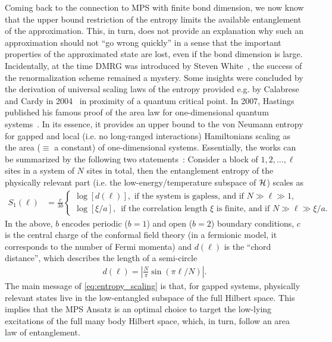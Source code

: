 Coming back to the connection to MPS with finite bond dimension, we now know that the upper bound restriction of the entropy limits the available entanglement of the approximation.
This, in turn, does not provide an explanation why such an approximation should not ``go wrong quickly'' in a sense that the important properties of the approximated state are lost, even if the bond dimension is large.
Incidentally, at the time DMRG was introduced by Steven White~\cite{White1992}, the success of the renormalization scheme remained a mystery.
Some insights were concluded by the derivation of universal scaling laws of the entropy provided e.g. by Calabrese and Cardy in 2004~\cite{Calabrese2004} in proximity of a quantum critical point.
In 2007, Hastings published his famous proof of the area law for one-dimensional quantum systems~\cite{Hastings2007}.
In its essence, it provides an upper bound to the von Neumann entropy for gapped and local (i.e. no long-ranged interactions) Hamiltonians scaling as the area ($\equiv$ a constant) of one-dimensional systems.
Essentially, the works can be summarized by the following two statements~\cite{Eisert2010}:
Consider a block of $1,2,\dots,\ell$ sites in a system of $N$ sites in total, then the entanglement entropy of the physically relevant part (i.e. the low-energy/temperature subspace of $\mathcal{H}$) scales as
\begin{align}
    S_1(\ell) &=
    \frac c{3b}
    \left\{
    \begin{array}{l}
        \log[d(\ell)],\text{ if the system is gapless, and if $N\gg\ell\gg 1$,}\\[0.25cm]
        \log[\xi/a],\,\text{ if the correlation length $\xi$ is finite, and if $N\gg\ell\gg\xi/a$.}
    \end{array}
    \right.
    \label{eq:entropy_scaling}
\end{align}
In the above, $b$ encodes periodic ($b=1$) and open ($b=2$) boundary conditions, $c$ is the central charge of the conformal field theory (in a fermionic model, it corresponds to the number of Fermi momenta) and $d(\ell)$ is the ``chord distance'', which describes the length of a semi-circle
\begin{align}
    d(\ell) = \left|\frac{N}{\pi}\sin(\pi\ell/N)\right|.
\end{align}
The main message of \cref{eq:entropy_scaling} is that, for gapped systems, physically relevant states live in the low-entangled subspace of the full Hilbert space.
This implies that the MPS Ansatz is an optimal choice to target the low-lying excitations of the full many body Hilbert space, which, in turn, follow an area law of entanglement.

